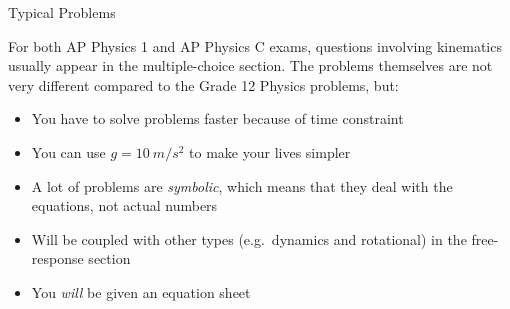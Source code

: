 \documentclass[12pt,compress,aspectratio=169]{beamer}
\begin{document}
\begin{frame}{Typical Problems}

  For both AP Physics 1 and AP Physics C exams, questions involving kinematics
  usually appear in the multiple-choice section. The problems themselves are
  not very different compared to the Grade 12 Physics problems, but:
  \begin{itemize}
  \item You have to solve problems faster because of time constraint
  \item You can use $g=\SI{10}{m/s^2}$ to make your lives simpler
  \item A lot of problems are \emph{symbolic}, which means that they deal with
    the equations, not actual numbers
  \item Will be coupled with other types (e.g.\ dynamics and rotational) in
    the free-response section
  \item You \emph{will} be given an equation sheet
  \end{itemize}
\end{frame}
\end{document}
